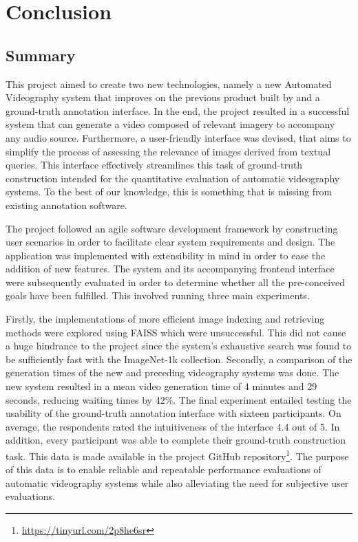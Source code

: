 \documentclass{l4proj}
\begin{document}
\chapter{Conclusion}    
\section{Summary}
This project aimed to create two new technologies, namely a new Automated Videography system that improves on the previous product built by \cite{parker} and a ground-truth annotation interface. In the end, the project resulted in a successful system that can generate a video composed of relevant imagery to accompany any audio source. Furthermore, a user-friendly interface was devised, that aims to simplify the process of assessing the relevance of images derived from textual queries. This interface effectively streamlines this task of ground-truth construction intended for the quantitative evaluation of automatic videography systems. To the best of our knowledge, this is something that is missing from existing annotation software.


The project followed an agile software development framework by constructing user scenarios in order to facilitate clear system requirements and design. The application was implemented with extensibility in mind in order to ease the addition of new features. The system and its accompanying frontend interface were subsequently evaluated in order to determine whether all the pre-conceived goals have been fulfilled. This involved running three main experiments. 

Firstly, the implementations of more efficient image indexing and retrieving methods were explored using FAISS which were unsuccessful. This did not cause a huge hindrance to the project since the system's exhaustive search was found to be sufficiently fast with the ImageNet-1k collection. Secondly, a comparison of the generation times of the new and preceding videography systems was done. The new system resulted in a mean video generation time of 4 minutes and 29 seconds, reducing waiting times by 42\%. The final experiment entailed testing the usability of the ground-truth annotation interface with sixteen participants. On average, the respondents rated the intuitiveness of the interface 4.4 out of 5. In addition, every participant was able to complete their ground-truth construction task. This data is made available in the project GitHub repository\footnote{\url{https://tinyurl.com/2p8he6sr}}. The purpose of this data is to enable reliable and repeatable performance evaluations of automatic videography systems while also alleviating the need for subjective user evaluations.
\end{document}
